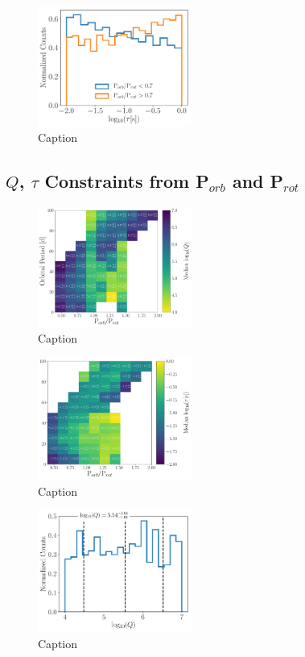 \documentclass[twocolumn]{aastex61}
\begin{document}
\begin{figure}
	\includegraphics[width=0.45\textwidth]{../Plots/subsyncTauHist.pdf}
   \caption{Caption}%
    \label{fig:subsyncTauHist}%
\end{figure}

\subsection{$Q$, $\tau$ Constraints from P$_{orb}$ and P$_{rot}$} \label{sec:qTau}

\begin{figure}
	\includegraphics[width=0.45\textwidth]{../Plots/porbProtPorbQHist.pdf}
   \caption{Caption}%
    \label{fig:qmap}%
\end{figure}

\begin{figure}
	\includegraphics[width=0.45\textwidth]{../Plots/porbProtPorbTauHist.pdf}
   \caption{Caption}%
    \label{fig:taumap}%
\end{figure}

\begin{figure}
	\includegraphics[width=0.45\textwidth]{../Plots/qLurie.pdf}
   \caption{Caption}%
    \label{fig:qLurie}%
\end{figure}
\end{document}
